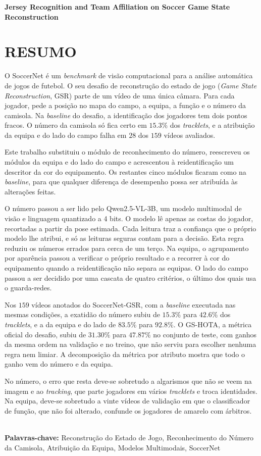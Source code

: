 \begingroup
\begin{flushleft}
\bfseries
{}
{\Large
Jersey Recognition and Team Affiliation on Soccer Game State Reconstruction}

\mdseries
\end{flushleft}
\normalsize
\let\clearpage\relax
\chapter{RESUMO}
\endgroup

\noindent O SoccerNet é um \emph{benchmark} de visão computacional para a análise automática de jogos de futebol. O seu desafio de reconstrução do estado de jogo (\emph{Game State Reconstruction}, GSR) parte de um vídeo de uma única câmara. Para cada jogador, pede a posição no mapa do campo, a equipa, a função e o número da camisola. Na \emph{baseline} do desafio, a identificação dos jogadores tem dois pontos fracos. O número da camisola só fica certo em $15.3\%$ dos \emph{tracklets}, e a atribuição da equipa e do lado do campo falha em $28$ dos $159$ vídeos avaliados.

Este trabalho substituiu o módulo de reconhecimento do número, reescreveu os módulos da equipa e do lado do campo e acrescentou à reidentificação um descritor da cor do equipamento. Os restantes cinco módulos ficaram como na \emph{baseline}, para que qualquer diferença de desempenho possa ser atribuída às alterações feitas.

O número passou a ser lido pelo Qwen2.5-VL-3B, um modelo multimodal de visão e linguagem quantizado a 4 bits. O modelo lê apenas as costas do jogador, recortadas a partir da pose estimada. Cada leitura traz a confiança que o próprio modelo lhe atribui, e só as leituras seguras contam para a decisão. Esta regra reduziu os números errados para cerca de um terço. Na equipa, o agrupamento por aparência passou a verificar o próprio resultado e a recorrer à cor do equipamento quando a reidentificação não separa as equipas. O lado do campo passou a ser decidido por uma cascata de quatro critérios, o último dos quais usa o guarda-redes.

Nos $159$ vídeos anotados do SoccerNet-GSR, com a \emph{baseline} executada nas mesmas condições, a exatidão do número subiu de $15.3\%$ para $42.6\%$ dos \emph{tracklets}, e a da equipa e do lado de $83.5\%$ para $92.8\%$. O GS-HOTA, a métrica oficial do desafio, subiu de $31.30\%$ para $47.87\%$ no conjunto de teste, com ganhos da mesma ordem na validação e no treino, que não serviu para escolher nenhuma regra nem limiar. A decomposição da métrica por atributo mostra que todo o ganho vem do número e da equipa.

No número, o erro que resta deve-se sobretudo a algarismos que não se veem na imagem e ao \emph{tracking}, que parte jogadores em vários \emph{tracklets} e troca identidades. Na equipa, deve-se sobretudo a vinte vídeos de validação em que o classificador de função, que não foi alterado, confunde os jogadores de amarelo com árbitros.


\hspace{3cm}\\
\indent
\textbf{Palavras-chave: } Reconstrução do Estado de Jogo, Reconhecimento do Número da Camisola,
Atribuição da Equipa, Modelos Multimodais, SoccerNet
